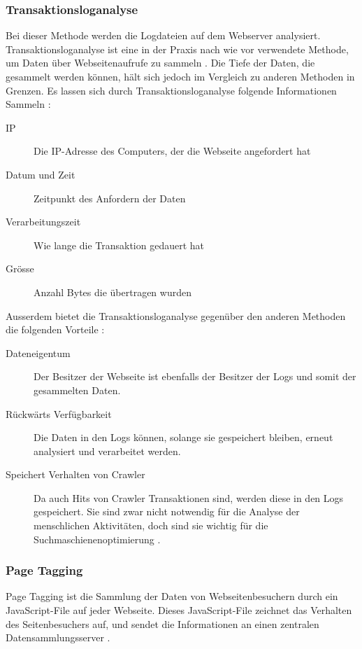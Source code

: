 \subsubsection{Transaktionsloganalyse} 
Bei dieser Methode werden die Logdateien auf dem Webserver analysiert. Transaktionsloganalyse ist eine in der Praxis nach wie vor verwendete Methode, um Daten über Webseitenaufrufe zu sammeln \parencite[S. 173]{nakatani2011toolselectionmethod}. Die Tiefe der Daten, die gesammelt werden können, hält sich jedoch im Vergleich zu anderen Methoden in Grenzen. Es lassen sich durch Transaktionsloganalyse folgende Informationen Sammeln \parencite[S. 2]{waisberg2009webShort}:

\begin{description}
  \item[IP] Die IP-Adresse des Computers, der die Webseite angefordert hat
  \item[Datum und Zeit] Zeitpunkt des Anfordern der Daten
  \item[Verarbeitungszeit] Wie lange die Transaktion gedauert hat
  \item[Grösse] Anzahl Bytes die übertragen wurden
\end{description}

Ausserdem bietet die Transaktionsloganalyse gegenüber den anderen Methoden die folgenden Vorteile \parencite[S. 2]{waisberg2009webShort}:

\begin{description}
  \item[Dateneigentum] Der Besitzer der Webseite ist ebenfalls der Besitzer der Logs und somit der gesammelten Daten. 
  \item[Rückwärts Verfügbarkeit] Die Daten in den Logs können, solange sie gespeichert bleiben, erneut analysiert und verarbeitet werden. 
  \item[Speichert Verhalten von Crawler] Da auch Hits von Crawler Transaktionen sind, werden diese in den Logs gespeichert. Sie sind zwar nicht notwendig für die Analyse der menschlichen Aktivitäten, doch sind sie wichtig für die Suchmaschienenoptimierung \parencite[S. 174]{nakatani2011toolselectionmethod}. 
\end{description}


\subsubsection{Page Tagging} 
Page Tagging ist die Sammlung der Daten von Webseitenbesuchern durch ein JavaScript-File auf jeder Webseite. Dieses JavaScript-File zeichnet das Verhalten des Seitenbesuchers auf, und sendet die Informationen an einen zentralen Datensammlungsserver \parencite[S. 173]{nakatani2011toolselectionmethod}.

